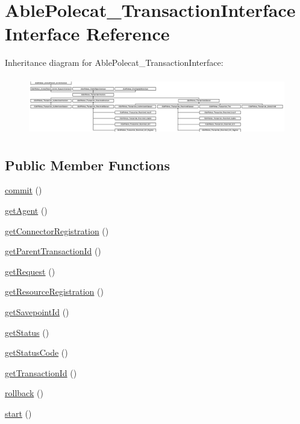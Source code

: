 \hypertarget{interface_able_polecat___transaction_interface}{}\section{Able\+Polecat\+\_\+\+Transaction\+Interface Interface Reference}
\label{interface_able_polecat___transaction_interface}
Inheritance diagram for Able\+Polecat\+\_\+\+Transaction\+Interface\+:\begin{figure}[H]
\begin{center}
\leavevmode
\includegraphics[height=2.560976cm]{interface_able_polecat___transaction_interface}
\end{center}
\end{figure}
\subsection*{Public Member Functions}
\begin{DoxyCompactItemize}
\item 
\hyperlink{interface_able_polecat___transaction_interface_af5674c27d4a92f6228565010eacbb9cb}{commit} ()
\item 
\hyperlink{interface_able_polecat___transaction_interface_a14f9546bbf5895db0fe37673bab21850}{get\+Agent} ()
\item 
\hyperlink{interface_able_polecat___transaction_interface_a3e5ea27c16b5306b60f4b105076ca501}{get\+Connector\+Registration} ()
\item 
\hyperlink{interface_able_polecat___transaction_interface_a780c17f0187ec8dba7d8b35b3325d44c}{get\+Parent\+Transaction\+Id} ()
\item 
\hyperlink{interface_able_polecat___transaction_interface_adf1a35ad20e475c59cc0967d5764aa22}{get\+Request} ()
\item 
\hyperlink{interface_able_polecat___transaction_interface_a8876f6810e05036d8c4007394576f53a}{get\+Resource\+Registration} ()
\item 
\hyperlink{interface_able_polecat___transaction_interface_aaaa36c40332d95e879b5072aba995d27}{get\+Savepoint\+Id} ()
\item 
\hyperlink{interface_able_polecat___transaction_interface_a9d21636071f529e2154051d3ea6e5921}{get\+Status} ()
\item 
\hyperlink{interface_able_polecat___transaction_interface_a094778dd1c04fe44626000b47ea0c0bb}{get\+Status\+Code} ()
\item 
\hyperlink{interface_able_polecat___transaction_interface_a83a4c2954e4da6dad24e596265e33d0a}{get\+Transaction\+Id} ()
\item 
\hyperlink{interface_able_polecat___transaction_interface_afa549adf79e3f8c09fe8f903dd5fbfa7}{rollback} ()
\item 
\hyperlink{interface_able_polecat___transaction_interface_af8fa59992209e36dccb3eefb0f75531f}{start} ()
\end{DoxyCompactItemize}
